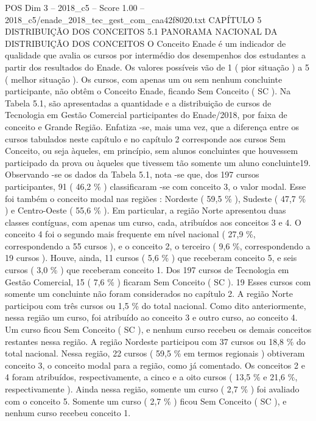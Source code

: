 \begin{textsample}{POS Dim 3 – 2018\_c5 – Score 1.00 – 2018\_c5/enade\_2018\_tec\_gest\_com\_caa42f8020.txt}  \label{ex:f3_pos_189}
CAPÍTULO 5 DISTRIBUIÇÃO DOS CONCEITOS 5.1 PANORAMA NACIONAL DA DISTRIBUIÇÃO DOS CONCEITOS O Conceito Enade é um indicador de qualidade que avalia os cursos por intermédio dos desempenhos dos estudantes a partir dos resultados do Enade.
Os valores possíveis vão de 1 ( pior situação ) a 5 ( melhor situação ).
Os cursos, com apenas um ou sem nenhum concluinte participante, não obtêm o Conceito Enade, ficando Sem Conceito ( SC ).
Na Tabela 5.1, são apresentadas a quantidade e a distribuição de cursos de Tecnologia em Gestão Comercial participantes do Enade/2018, por faixa de conceito e Grande Região.
Enfatiza -se, mais uma vez, que a diferença entre os cursos tabulados neste capítulo e no capítulo 2 corresponde aos cursos Sem Conceito, ou seja àqueles, em princípio, sem alunos concluintes que houvessem participado da prova ou àqueles que tivessem tão somente um aluno concluinte19.
Observando -se os dados da Tabela 5.1, nota -se que, dos 197 cursos participantes, 91 ( 46,2 \% ) classificaram -se com conceito 3, o valor modal.
Esse foi também o conceito modal nas regiões : Nordeste ( 59,5 \% ), Sudeste ( 47,7 \% ) e Centro-Oeste ( 55,6 \% ).
Em particular, a região Norte apresentou duas classes contíguas, com apenas um curso, cada, atribuídos aos conceitos 3 e 4.
O conceito 4 foi o segundo mais frequente em nível nacional ( 27,9 \%, correspondendo a 55 cursos ), e o conceito 2, o terceiro ( 9,6 \%, correspondendo a 19 cursos ).
Houve, ainda, 11 cursos ( 5,6 \% ) que receberam conceito 5, e seis cursos ( 3,0 \% ) que receberam conceito 1.
Dos 197 cursos de Tecnologia em Gestão Comercial, 15 ( 7,6 \% ) ficaram Sem Conceito ( SC ). 19 Esses cursos com somente um concluinte não foram considerados no capítulo 2.
A região Norte participou com três cursos ou 1,5 \% do total nacional.
Como dito anteriormente, nessa região um curso, foi atribuído ao conceito 3 e outro curso, ao conceito 4.
Um curso ficou Sem Conceito ( SC ), e nenhum curso recebeu os demais conceitos restantes nessa região.
A região Nordeste participou com 37 cursos ou 18,8 \% do total nacional.
Nessa região, 22 cursos ( 59,5 \% em termos regionais ) obtiveram conceito 3, o conceito modal para a região, como já comentado.
Os conceitos 2 e 4 foram atribuídos, respectivamente, a cinco e a oito cursos ( 13,5 \% e 21,6 \%, respectivamente ).
Ainda nessa região, somente um curso ( 2,7 \% ) foi avaliado com o conceito 5.
Somente um curso ( 2,7 \% ) ficou Sem Conceito ( SC ), e nenhum curso recebeu conceito 1.

\end{textsample}
